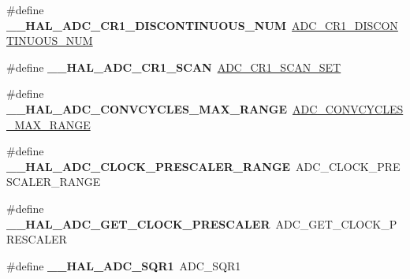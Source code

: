 \begin{DoxyCompactItemize}
\item 
\mbox{\label{group___h_a_l___a_d_c___aliased___macros_gab00342d0ece8deb8900df22b5193377e}} 
\#define {\bfseries \+\_\+\+\_\+\+H\+A\+L\+\_\+\+A\+D\+C\+\_\+\+C\+R1\+\_\+\+D\+I\+S\+C\+O\+N\+T\+I\+N\+U\+O\+U\+S\+\_\+\+N\+UM}~\hyperlink{group___a_d_c___private___macros_gaf52092c7978306ff922b2a6b42087472}{A\+D\+C\+\_\+\+C\+R1\+\_\+\+D\+I\+S\+C\+O\+N\+T\+I\+N\+U\+O\+U\+S\+\_\+\+N\+UM}
\item 
\mbox{\label{group___h_a_l___a_d_c___aliased___macros_gae645d58040b162666fa506aeb3728f49}} 
\#define {\bfseries \+\_\+\+\_\+\+H\+A\+L\+\_\+\+A\+D\+C\+\_\+\+C\+R1\+\_\+\+S\+C\+AN}~\hyperlink{group___a_d_c___private___macros_ga8cd628bbd49f48a40b2de13077c7ba3d}{A\+D\+C\+\_\+\+C\+R1\+\_\+\+S\+C\+A\+N\+\_\+\+S\+ET}
\item 
\mbox{\label{group___h_a_l___a_d_c___aliased___macros_gaffcdf78845300c37812650611d2915b4}} 
\#define {\bfseries \+\_\+\+\_\+\+H\+A\+L\+\_\+\+A\+D\+C\+\_\+\+C\+O\+N\+V\+C\+Y\+C\+L\+E\+S\+\_\+\+M\+A\+X\+\_\+\+R\+A\+N\+GE}~\hyperlink{group___a_d_c___private___macros_ga649e53d6a9a5716d9dce4d58904a3884}{A\+D\+C\+\_\+\+C\+O\+N\+V\+C\+Y\+C\+L\+E\+S\+\_\+\+M\+A\+X\+\_\+\+R\+A\+N\+GE}
\item 
\mbox{\label{group___h_a_l___a_d_c___aliased___macros_gad371b9c9ce847537972a0bc6c1422c45}} 
\#define {\bfseries \+\_\+\+\_\+\+H\+A\+L\+\_\+\+A\+D\+C\+\_\+\+C\+L\+O\+C\+K\+\_\+\+P\+R\+E\+S\+C\+A\+L\+E\+R\+\_\+\+R\+A\+N\+GE}~A\+D\+C\+\_\+\+C\+L\+O\+C\+K\+\_\+\+P\+R\+E\+S\+C\+A\+L\+E\+R\+\_\+\+R\+A\+N\+GE
\item 
\mbox{\label{group___h_a_l___a_d_c___aliased___macros_ga0595fba00a50ea5ba7b8baf4cbdd6820}} 
\#define {\bfseries \+\_\+\+\_\+\+H\+A\+L\+\_\+\+A\+D\+C\+\_\+\+G\+E\+T\+\_\+\+C\+L\+O\+C\+K\+\_\+\+P\+R\+E\+S\+C\+A\+L\+ER}~A\+D\+C\+\_\+\+G\+E\+T\+\_\+\+C\+L\+O\+C\+K\+\_\+\+P\+R\+E\+S\+C\+A\+L\+ER
\item 
\mbox{\label{group___h_a_l___a_d_c___aliased___macros_ga7355b4d9c49af127fdb5a1dd7e8b66f0}} 
\#define {\bfseries \+\_\+\+\_\+\+H\+A\+L\+\_\+\+A\+D\+C\+\_\+\+S\+Q\+R1}~A\+D\+C\+\_\+\+S\+Q\+R1

\end{DoxyCompactItemize}
